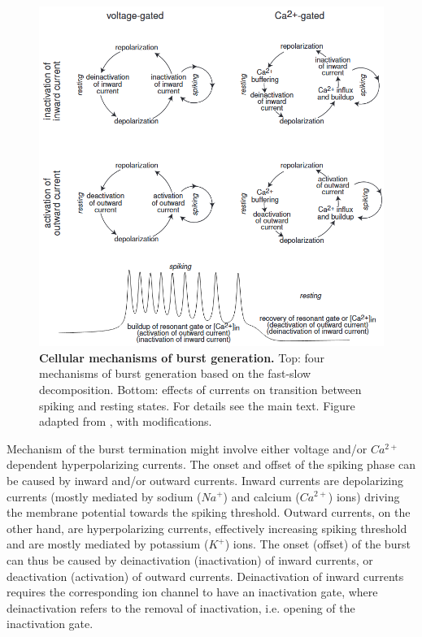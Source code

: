 \documentclass[../main.tex]{subfiles}
\begin{document}
\begin{figure}[!t]
    \centering
    \includegraphics[width=0.85\linewidth]{../img/modelling_r5/examples/bursting_ionic_basis.png}
    \caption[Cellular mechanisms of burst generation]{
        \textbf{Cellular mechanisms of burst generation.}
        Top: four mechanisms of burst generation based on the fast-slow decomposition. Bottom: effects of currents on transition between spiking and resting states.
        For details see the main text.
        Figure adapted from \cite{izhikevichDynamicalSystemsNeuroscience2006}, with modifications.
    }
    \label{fig:ionic_basis_for_slow_fast_bursting}
\end{figure}

Mechanism of the burst termination might involve either voltage and/or $Ca^{2+}$ dependent hyperpolarizing currents.
The onset and offset of the spiking phase can be caused by inward and/or outward currents. Inward currents are depolarizing currents (mostly mediated by sodium ($Na^+$) and calcium ($Ca^{2+}$) ions) driving the membrane potential towards the spiking threshold. Outward currents, on the other hand, are hyperpolarizing currents, effectively increasing spiking threshold and are mostly mediated by potassium ($K^+$) ions.
The onset (offset) of the burst can thus be caused by deinactivation (inactivation) of inward currents, or deactivation (activation) of outward currents. Deinactivation of inward currents requires the corresponding ion channel to have an inactivation gate, where deinactivation refers to the removal of inactivation, i.e. opening of the inactivation gate.
\end{document}
